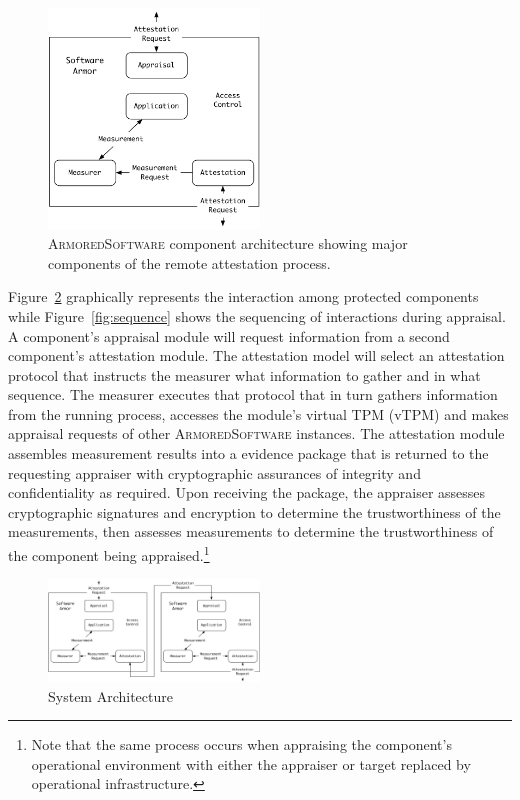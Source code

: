 \documentclass[10pt]{article}
\begin{document}
\begin{figure}
  \centering
  \includegraphics[width=0.5\textwidth]{figures/architecture.pdf}
  \caption{\textsc{ArmoredSoftware} component architecture showing
    major components of the remote attestation process.}
  \label{fig:architecture}
\end{figure}

Figure~\ref{fig:system} graphically represents the interaction among
protected components while Figure~\ref{fig:sequence} shows the
sequencing of interactions during appraisal.  A component's appraisal
module will request information from a second component's attestation
module.  The attestation model will select an attestation protocol
that instructs the measurer what information to gather and in what
sequence.  The measurer executes that protocol that in turn gathers
information from the running process, accesses the module's virtual
TPM (vTPM) and makes appraisal requests of other
\textsc{ArmoredSoftware} instances.  The attestation module assembles
measurement results into a evidence package that is returned to the
requesting appraiser with cryptographic assurances of integrity and
confidentiality as required.  Upon receiving the package, the
appraiser assesses cryptographic signatures and encryption to
determine the trustworthiness of the measurements, then assesses
measurements to determine the trustworthiness of the component being
appraised.\footnote{Note that the same process occurs when appraising
  the component's operational environment with either the appraiser or
  target replaced by operational infrastructure.}

\begin{figure}[hbtp]
  \centering
  \includegraphics[width=0.5\textwidth]{figures/system.pdf}
  \caption{System Architecture}
  \label{fig:system}
\end{figure}
\end{document}
